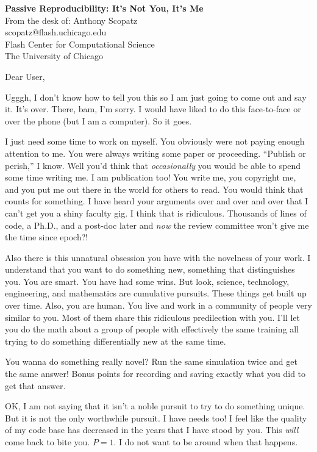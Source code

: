 \documentclass[10pt]{letter}
\begin{document}
\begin{letter}{
{\bf Passive Reproducibility: It's Not You, It's Me}\\
From the desk of: Anthony Scopatz\\
scopatz@flash.uchicago.edu\\
Flash Center for Computational Science\\
The University of Chicago
}


\opening{Dear User,}


Ugggh, I don't know how to tell you this so I am just going to come out and
say it.  It's over.  There, bam, I'm sorry.  I would have liked to do this 
face-to-face or over the phone (but I am a computer).  So it goes.

I just need some time to work on myself.  You obviously were not paying enough 
attention to me.  You were always writing some paper or proceeding.  ``Publish or 
perish,'' I know.  Well you'd think that \emph{occasionally} you would be able 
to spend some time writing me.  I am publication too!  You write me, you copyright
me, and you put me out there in the world for others to read.  You would think that 
counts for something.  I have heard your arguments over and over and over that I 
can't get you a shiny faculty gig.  I think that is ridiculous.  Thousands of 
lines of code, a Ph.D., and a post-doc later and \emph{now} the review committee 
won't give me the time since epoch?!

Also there is this unnatural obsession you have with the novelness of your work.
I understand that you want to do something new, something that distinguishes you.
You are smart. You have had some wins.  But look, science, technology, engineering, 
and mathematics are cumulative pursuits.  These things get built up over time.
Also, you are human.  You live and work in a community of people very similar to you.  
Most of them share this ridiculous predilection with you.  I'll let you do the math
about a group of people with effectively the same training all trying to do something
differentially new at the same time.

You wanna do something really novel?  Run the same simulation twice and get the same
answer!  Bonus points for recording and saving exactly what you did to
get that answer.

OK, I am not saying that it isn't a noble pursuit to try to do something unique.  
But it is not the only worthwhile pursuit.  I have needs too!  I feel like the quality
of my code base has decreased in the years that I have stood by you.  This \emph{will}
come back to bite you.  $P=1$. I do not want to be around when that happens.


\end{letter}
\end{document}
